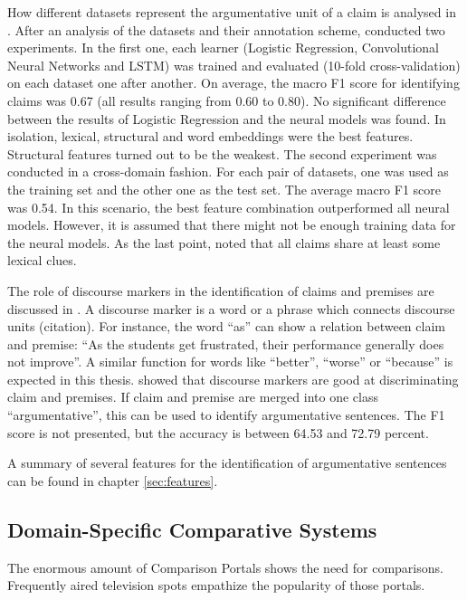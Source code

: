 How different datasets represent the argumentative unit of a claim is analysed in \cite{Daxenberger2017What-is-the-Ess}. After an analysis of the datasets and their annotation scheme, \cite{Daxenberger2017What-is-the-Ess} conducted two experiments.
In the first one, each learner (Logistic Regression, Convolutional Neural Networks and LSTM) was trained and evaluated (10-fold cross-validation) on each dataset one after another. On average, the macro F1 score for identifying claims was 0.67 (all results ranging from 0.60 to 0.80). No significant difference between the results of Logistic Regression and the neural models was found. In isolation, lexical, structural and word embeddings were the best features. Structural features turned out to be the weakest.
The second experiment was conducted in a cross-domain fashion. For each pair of datasets, one was used as the training set and the other one as the test set. The average macro F1 score was 0.54. In this scenario, the best feature combination outperformed all neural models. However, it is assumed that there might not be enough training data for the neural models.
As the last point, \cite{Daxenberger2017What-is-the-Ess} noted that all claims share at least some lexical clues.


The role of discourse markers in the identification of claims and premises are discussed in \cite{Eckle-Kohler2015On-the-Role-of-}. A discourse marker is a word or a phrase which connects discourse units (citation). For instance, the word \enquote{as} can show a relation between claim and premise: \enquote{As the students get frustrated, their performance generally does not improve}.  A similar function for words like \enquote{better}, \enquote{worse} or \enquote{because} is expected in this thesis. \cite{Eckle-Kohler2015On-the-Role-of-} showed that discourse markers are good at discriminating claim and premises. If claim and premise are merged into one class \enquote{argumentative}, this can be used to identify argumentative sentences. The F1 score is not presented, but the accuracy is between 64.53 and 72.79 percent.

A summary of several features for the identification of argumentative sentences can be found in chapter \ref{sec:features}.





\subsection{Domain-Specific Comparative Systems}
The enormous amount of Comparison Portals shows the need for comparisons. Frequently aired television spots empathize the popularity of those portals.

